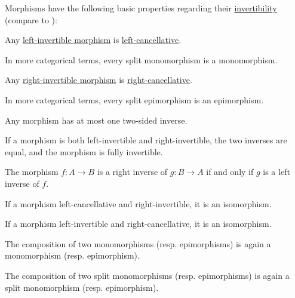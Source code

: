 \begin{proposition}\label{thm:def:morphism_invertibility}
  Morphisms have the following basic properties regarding their \hyperref[def:morphism_invertibility]{invertibility} (compare to ):

  \begin{thmenum}
     Any \hyperref[def:morphism_invertibility/left_invertible]{left-invertible morphism} is \hyperref[def:morphism_invertibility/left_cancellative]{left-cancellative}.

    In more categorical terms, every split monomorphism is a monomorphism.

     Any \hyperref[def:morphism_invertibility/right_invertible]{right-invertible morphism} is \hyperref[def:morphism_invertibility/right_cancellative]{right-cancellative}.

    In more categorical terms, every split epimorphism is an epimorphism.

     Any morphism has at most one two-sided inverse.

     If a morphism is both left-invertible and right-invertible, the two inverses are equal, and the morphism is fully invertible.

     The morphism \( f: A \to B \) is a right inverse of \( g: B \to A \) if and only if \( g \) is a left inverse of \( f \).

     If a morphism left-cancellative and right-invertible, it is an isomorphism.

     If a morphism left-invertible and right-cancellative, it is an isomorphism.

     The composition of two monomorphisms (resp. epimorphisms) is again a monomorphism (resp. epimorphism).

     The composition of two split monomorphisms (resp. epimorphisms) is again a split monomorphism (resp. epimorphism).
  \end{thmenum}
\end{proposition}
